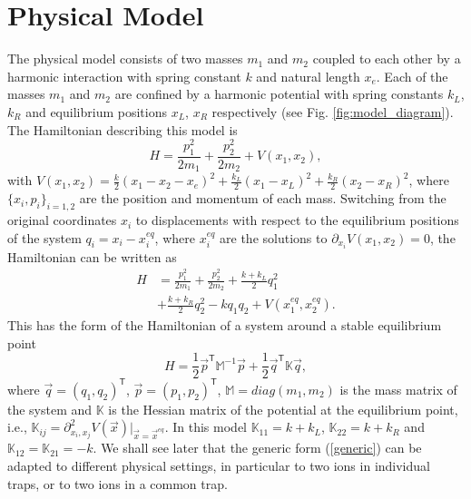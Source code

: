 \section{Physical Model \label{sec:Physical_Model}}

The physical model consists of two masses $m_1$ and $m_2$ coupled to each other by a harmonic interaction with spring constant $k$ and natural length $x_e$. Each of the masses $m_1$ and $m_2$ are confined by a harmonic potential with spring constants $k_L$, $k_R$ and equilibrium positions $x_L$, $x_R$ respectively (see Fig. \ref{fig:model_diagram}). The Hamiltonian describing this model is
%
\begin{equation}
  H = \frac{p_1^2}{2m_1} + \frac{p_2^2}{2m_2} + V(x_1,x_2),
  \label{eq:HamiltonianOriginalCordinates}
\end{equation}
%
with $V(x_1,x_2)=\frac{k}{2}\left( x_1 - x_2 - x_e \right)^2 + \frac{k_L}{2}\left( x_1 - x_L \right)^2 + \frac{k_R}{2}\left( x_2 - x_R \right)^2$,  where \linebreak $\{x_i,p_i\}_{i=1,2}$ are the position and momentum of each mass. Switching from the original coordinates $x_i$ to displacements with respect to the equilibrium positions of the system $q_i = x_i - x_i^{eq}$, where $x_i^{eq}$ are the solutions to $\partial_{x_i}V(x_1,x_2)=0$, the Hamiltonian can be written as
%
\begin{align}
  H &= \frac{p_1^2}{2m_1} + \frac{p_2^2}{2m_2} + \frac{k+k_L}{2}q_1^2\nonumber\\ &+ \frac{k+k_R}{2}q_2^2 - k q_1 q_2 + V(x_1^{eq},x_2^{eq}).
  \label{eq:Hamiltonian}
\end{align}
%
This has the form of  the Hamiltonian of a system around a stable equilibrium point
%
\begin{equation}
  H = \frac{1}{2} \overrightarrow{p}^\mathsf{T}\mathbb{M}^{-1}\overrightarrow{p} + \frac{1}{2} \overrightarrow{q}^\mathsf{T}\mathbb{K}\overrightarrow{q},
\label{generic}
\end{equation}
%
where $\overrightarrow{q} = \left(q_1,q_2\right)^\mathsf{T}$, $\overrightarrow{p} = \left(p_1,p_2\right)^\mathsf{T}$, $\mathbb{M} = diag(m_1,m_2)$ is the mass matrix of the system and $\mathbb{K}$ is the Hessian matrix of the potential at the equilibrium point, i.e., $\mathbb{K}_{ij} = \partial^2_{x_i,x_j}V(\overrightarrow{x})\Big|_{\overrightarrow{x} = \overrightarrow{x}^{eq}}$. In this model  $\mathbb{K}_{11} = k + k_L$, $\mathbb{K}_{22} = k + k_R$ and $\mathbb{K}_{12} = \mathbb{K}_{21} = -k$.
We shall see later that
the generic form (\ref{generic}) can be adapted to different physical settings, in particular to
two ions in individual traps, or to two ions in a common trap.


